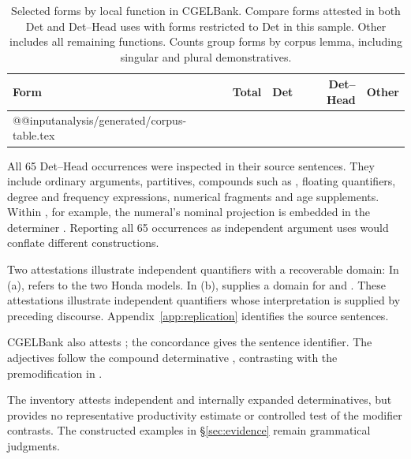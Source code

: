 \documentclass[12pt]{article}
\makeatletter
\newcommand{\tablebody}[1]{\csname @@input\endcsname #1 }
\makeatother
\begin{document}
\begin{table}[tb]
\centering\small
\caption{Selected forms by local function in CGELBank. Compare forms attested in both Det and Det--Head uses with forms restricted to Det in this sample. Other includes all remaining functions. Counts group forms by corpus lemma, including singular and plural demonstratives.}\label{tab:corpus}
\begin{tabular}{lrrrr}
\toprule
Form & Total & Det & Det--Head & Other \\
\midrule
\tablebody{analysis/generated/corpus-table.tex}
\bottomrule
\end{tabular}
\end{table}

All 65 Det--Head occurrences were inspected in their source sentences. They include ordinary arguments, partitives, compounds such as , floating quantifiers, degree and frequency expressions, numerical fragments and age supplements. Within , for example, the numeral's nominal projection is embedded in the determiner . Reporting all 65 occurrences as independent argument uses would conflate different constructions.

Two attestations illustrate independent quantifiers with a recoverable domain:
\ea\label{ex:attested-quantifiers}
\ea {}
\ex {}
\z\z
In (a),  refers to the two Honda models. In (b),  supplies a domain for  and . These attestations illustrate independent quantifiers whose interpretation is supplied by preceding discourse. Appendix~\ref{app:replication} identifies the source sentences.

CGELBank also attests ; the concordance gives the sentence identifier. The adjectives follow the compound determinative , contrasting with the premodification in .

The inventory attests independent and internally expanded determinatives, but provides no representative productivity estimate or controlled test of the modifier contrasts. The constructed examples in §\ref{sec:evidence} remain grammatical judgments.
\end{document}
